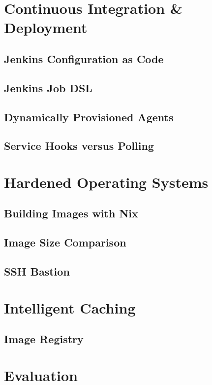 \chapter{Continuous Integration \& Deployment}

\section{Jenkins Configuration as Code}

\section{Jenkins Job DSL}

\section{Dynamically Provisioned Agents}

\section{Service Hooks versus Polling}

\chapter{Hardened Operating Systems}

\section{Building Images with Nix}

\section{Image Size Comparison}

\section{SSH Bastion}

\chapter{Intelligent Caching}

\section{Image Registry}

\chapter{Evaluation}

